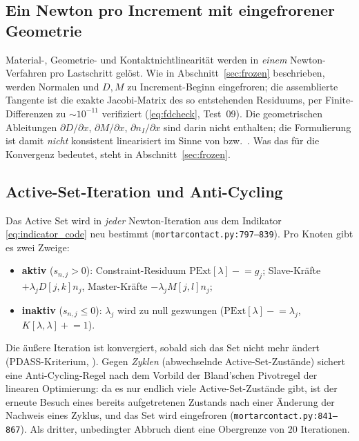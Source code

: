 \documentclass[a4paper,11pt]{article}
\def\bm#1{#1}%
\def\tilde#1{#1}%
\newcommand{\file}[1]{\texttt{\small #1}}
\begin{document}
\subsection{Ein Newton pro Increment mit eingefrorener Geometrie}
Material-, Geometrie- und Kontaktnichtlinearität werden in \emph{einem} Newton-Verfahren pro
Lastschritt gelöst. Wie in Abschnitt~\ref{sec:frozen} beschrieben, werden Normalen und
$\bm D,\bm M$ zu Increment-Beginn eingefroren; die assemblierte Tangente ist die exakte
Jacobi-Matrix des so entstehenden Residuums, per Finite-Differenzen zu $\sim10^{-11}$
verifiziert (\eqref{eq:fdcheck}, Test~09). Die geometrischen Ableitungen
$\partial\bm D/\partial\bm x$, $\partial\bm M/\partial\bm x$, $\partial\bm n_I/\partial\bm x$
sind darin nicht enthalten; die Formulierung ist damit \emph{nicht} konsistent linearisiert im
Sinne von \citet{popp2010} bzw.\ \citet[Kap.~4]{farah}. Was das für die Konvergenz bedeutet, steht
in Abschnitt~\ref{sec:frozen}.

\subsection{Active-Set-Iteration und Anti-Cycling}
Das Active Set wird in \emph{jeder} Newton-Iteration aus dem Indikator \eqref{eq:indicator_code} neu
bestimmt (\file{mortarcontact.py:\allowbreak{}797--839}). Pro Knoten gibt es zwei Zweige:
\begin{itemize}\itemsep2pt
  \item \textbf{aktiv} ($s_{n,j}>0$): Constraint-Residuum $\text{PExt}[\lambda]\!-\!\!=\!\tilde g_j$;
        Slave-Kräfte $+\lambda_j\bm D[j,k]\bm n_j$, Master-Kräfte $-\lambda_j\bm M[j,l]\bm n_j$;
  \item \textbf{inaktiv} ($s_{n,j}\le0$): $\lambda_j$ wird zu null gezwungen
        ($\text{PExt}[\lambda]\!-\!\!=\!\lambda_j$, $K[\lambda,\lambda]\!+\!\!=\!1$).
\end{itemize}
Die äußere Iteration ist konvergiert, sobald sich das Set nicht mehr ändert (PDASS-Kriterium,
\citealp{hueber2005}). Gegen \emph{Zyklen} (abwechselnde Active-Set-Zustände) sichert eine
Anti-Cycling-Regel nach dem Vorbild der Bland'schen Pivotregel der linearen Optimierung: da es nur
endlich viele Active-Set-Zustände gibt, ist der erneute Besuch eines bereits aufgetretenen Zustands
nach einer Änderung der Nachweis eines Zyklus, und das Set wird eingefroren
(\file{mortarcontact.py:\allowbreak{}841--867}). Als dritter, unbedingter Abbruch dient eine
Obergrenze von $20$ Iterationen.
\end{document}
